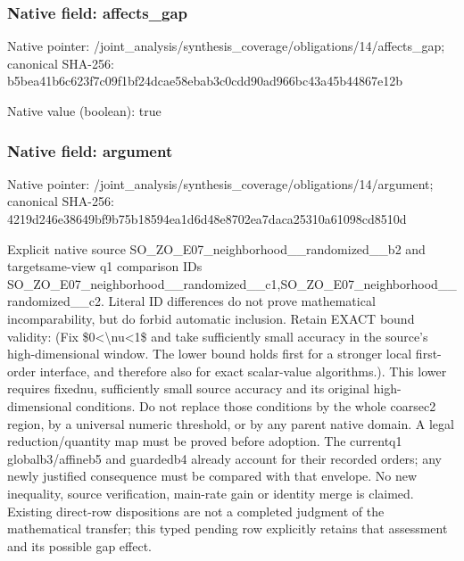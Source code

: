 \documentclass[10pt,a4paper]{article}
\begin{document}
\subsubsection{Native field: affects\_\allowbreak{}gap}
Native pointer: /joint\_\allowbreak{}analysis/synthesis\_\allowbreak{}coverage/obligations/14/affects\_\allowbreak{}gap; canonical SHA-256: b5bea41b6c623f7c09f1bf24dcae58ebab3c0cdd90ad966bc43a45b44867e12b

Native value (boolean): true

\subsubsection{Native field: argument}
Native pointer: /joint\_\allowbreak{}analysis/synthesis\_\allowbreak{}coverage/obligations/14/argument; canonical SHA-256: 4219d246e38649bf9b75b18594ea1d6d48e8702ea7daca25310a61098cd8510d

\begingroup\raggedright\sloppy Explicit native source SO\_\allowbreak{}ZO\_\allowbreak{}E07\_\allowbreak{}neighborhood\_\allowbreak{}\_\allowbreak{}randomized\_\allowbreak{}\_\allowbreak{}b2 and targetsame-view q1 comparison IDs SO\_\allowbreak{}ZO\_\allowbreak{}E07\_\allowbreak{}neighborhood\_\allowbreak{}\_\allowbreak{}randomized\_\allowbreak{}\_\allowbreak{}c1,\allowbreak{}SO\_\allowbreak{}ZO\_\allowbreak{}E07\_\allowbreak{}neighborhood\_\allowbreak{}\_\allowbreak{}randomized\_\allowbreak{}\_\allowbreak{}c2. Literal ID differences do not prove mathematical incomparability,\allowbreak{} but do forbid automatic inclusion. Retain EXACT bound validity:\allowbreak{} (Fix \$0<\textbackslash{}nu<1\$ and take sufficiently small accuracy in the source's high-dimensional window. The lower bound holds first for a stronger local first-order interface,\allowbreak{} and therefore also for exact scalar-value algorithms.). This lower requires fixednu,\allowbreak{} sufficiently small source accuracy and its original high-dimensional conditions. Do not replace those conditions by the whole coarsec2 region,\allowbreak{} by a universal numeric threshold,\allowbreak{} or by any parent native domain. A legal reduction/\allowbreak{}quantity map must be proved before adoption. The currentq1 globalb3/\allowbreak{}affineb5 and guardedb4 already account for their recorded orders;\allowbreak{} any newly justified consequence must be compared with that envelope. No new inequality,\allowbreak{} source verification,\allowbreak{} main-rate gain or identity merge is claimed. Existing direct-row dispositions are not a completed judgment of the mathematical transfer;\allowbreak{} this typed pending row explicitly retains that assessment and its possible gap effect.\par\endgroup
\end{document}
